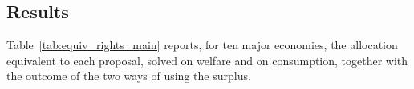 \documentclass[12pt,english]{article}
\theoremstyle{remark}
\begin{document}

\subsection{Results}

Table~\ref{tab:equiv_rights_main} reports, for ten major economies, the allocation equivalent to each proposal, solved on welfare and on consumption, together with the outcome of the two ways of using the surplus.
\end{document}

